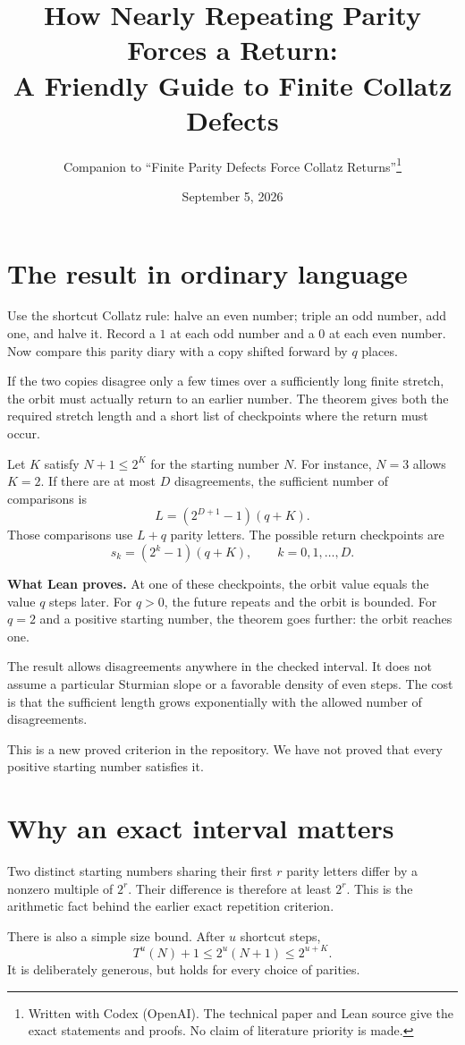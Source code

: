 \documentclass[11pt]{article}
\title{How Nearly Repeating Parity Forces a Return:\\
\Large A Friendly Guide to Finite Collatz Defects}
\author{Companion to ``Finite Parity Defects Force Collatz Returns''\thanks{Written with Codex (OpenAI). The technical paper and Lean source give the exact statements and proofs. No claim of literature priority is made.}}
\date{September 5, 2026}
\begin{document}
\maketitle

\section{The result in ordinary language}
Use the shortcut Collatz rule: halve an even number; triple an odd
number, add one, and halve it. Record a $1$ at each odd number and a
$0$ at each even number. Now compare this parity diary with a copy
shifted forward by $q$ places.

If the two copies disagree only a few times over a sufficiently long
finite stretch, the orbit must actually return to an earlier number.
The theorem gives both the required stretch length and a short list
of checkpoints where the return must occur.

Let $K$ satisfy $N+1\le2^K$ for the starting number $N$. For instance,
$N=3$ allows $K=2$. If there are at most $D$ disagreements, the
sufficient number of comparisons is
\[
L=(2^{D+1}-1)(q+K).
\]
Those comparisons use $L+q$ parity letters. The possible return
checkpoints are
\[
s_k=(2^k-1)(q+K),\qquad k=0,1,\ldots,D.
\]
\begin{keyidea}
\textbf{What Lean proves.} At one of these checkpoints, the orbit
value equals the value $q$ steps later. For $q>0$, the future repeats
and the orbit is bounded. For $q=2$ and a positive starting number,
the theorem goes further: the orbit reaches one.
\end{keyidea}
The result allows disagreements anywhere in the checked interval.
It does not assume a particular Sturmian slope or a favorable density
of even steps. The cost is that the sufficient length grows
exponentially with the allowed number of disagreements.

This is a new proved criterion in the repository. We have not proved
that every positive starting number satisfies it.

\newpage
\section{Why an exact interval matters}
Two distinct starting numbers sharing their first $r$ parity letters
differ by a nonzero multiple of $2^r$. Their difference is therefore
at least $2^r$. This is the arithmetic fact behind the earlier exact
repetition criterion.

There is also a simple size bound. After $u$ shortcut steps,
\[
T^u(N)+1\le2^u(N+1)\le2^{u+K}.
\]
It is deliberately generous, but holds for every choice of parities.
\end{document}
